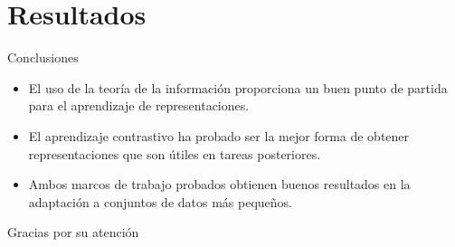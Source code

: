 \documentclass[aspectratio=169]{beamer}
\begin{document}
  
  \begin{frame}
  \end{frame}

  \section{Resultados}




  
  \begin{frame}{Conclusiones}

    \begin{itemize}
      \item El uso de la teoría de la información proporciona un buen punto de partida para el aprendizaje de representaciones.
      \item El aprendizaje contrastivo ha probado ser la mejor forma de obtener representaciones que son útiles en tareas posteriores.
      \item Ambos marcos de trabajo probados obtienen buenos resultados en la adaptación a conjuntos de datos más pequeños.
    \end{itemize}
  \end{frame}
  
  \appendix

  \begin{frame}
    Gracias por su atención
  \end{frame}
\end{document}
